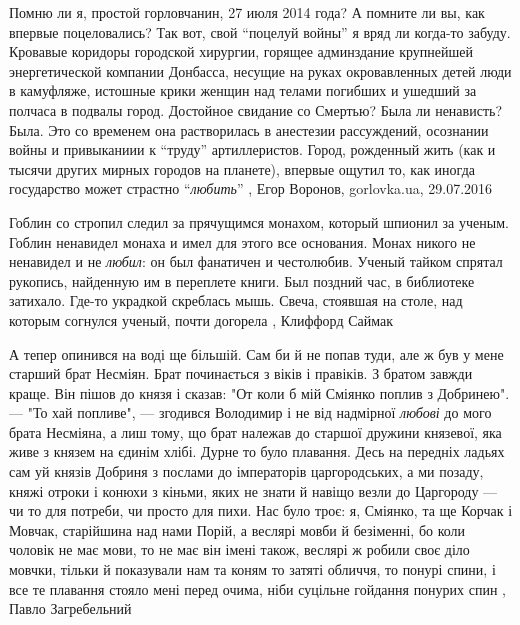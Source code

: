 Помню ли я, простой горловчанин, 27 июля 2014 года? А помните ли вы, как
впервые поцеловались? Так вот, свой \enquote{поцелуй войны} я вряд ли когда-то забуду.
Кровавые коридоры городской хирургии, горящее админздание крупнейшей
энергетической компании Донбасса, несущие на руках окровавленных детей люди в
камуфляже, истошные крики женщин над телами погибших и ушедший за полчаса в
подвалы город. Достойное свидание со Смертью? Была ли ненависть? Была. Это со
временем она растворилась в анестезии рассуждений, осознании войны и
привыканиии к \enquote{труду} артиллеристов. Город, рожденный жить (как и тысячи других
мирных городов на планете), впервые ощутил то, как иногда государство может
страстно \enquote{\emph{любить}}
, 
Егор Воронов, gorlovka.ua, 29.07.2016

Гоблин со стропил следил за прячущимся монахом, который шпионил за ученым.
Гоблин ненавидел монаха и имел для этого все основания. Монах никого не
ненавидел и не \emph{любил}: он был фанатичен и честолюбив. Ученый тайком
спрятал рукопись, найденную им в переплете книги.  Был поздний час, в
библиотеке затихало. Где-то украдкой скреблась мышь. Свеча, стоявшая на столе,
над которым согнулся ученый, почти догорела
, Клиффорд Саймак

А тепер опинився на воді ще більшій. Сам би й не попав туди, але ж був у мене
старший брат Несміян. Брат починається з віків і правіків. З братом завжди
краще. Він пішов до князя і сказав: "От коли б мій Сміянко поплив з Добринею".
— "То хай попливе", — згодився Володимир і не від надмірної \emph{любові} до
мого брата Несміяна, а лиш тому, що брат належав до старшої дружини князевої,
яка живе з князем на єдинім хлібі.  Дурне то було плавання. Десь на передніх
ладьях сам уй князів Добриня з послами до імператорів царгородських, а ми
позаду, княжі отроки і конюхи з кіньми, яких не знати й навіщо везли до
Царгороду — чи то для потреби, чи просто для пихи. Нас було троє: я, Сміянко,
та ще Корчак і Мовчак, старійшина над нами Порій, а веслярі мовби й безіменні,
бо коли чоловік не має мови, то не має він імені також, веслярі ж робили своє
діло мовчки, тільки й показували нам та коням то затяті обличчя, то понурі
спини, і все те плавання стояло мені перед очима, ніби суцільне гойдання
понурих спин
, Павло Загребельний 

